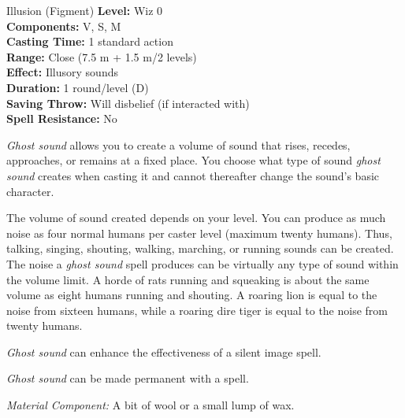 {Illusion (Figment)}
{
	\textbf{Level:}
	Wiz 0\\
	\textbf{Components:}
	V, S, M\\
	\textbf{Casting Time:}
	1 standard action\\
	\textbf{Range:}
	Close (7.5 m + 1.5 m/2 levels)\\
	\textbf{Effect:}
	Illusory sounds\\
	\textbf{Duration:}
	1 round/level (D)\\
	\textbf{Saving Throw:}
	Will disbelief (if interacted with)\\
	\textbf{Spell Resistance:}
	No\\
}
{
	\emph{Ghost sound} allows you to create a volume of sound that rises, recedes, approaches, or remains at a fixed place. You choose what type of sound \emph{ghost sound} creates when casting it and cannot thereafter change the sound's basic character.

	The volume of sound created depends on your level. You can produce as much noise as four normal humans per caster level (maximum twenty humans). Thus, talking, singing, shouting, walking, marching, or running sounds can be created. The noise a \emph{ghost sound} spell produces can be virtually any type of sound within the volume limit. A horde of rats running and squeaking is about the same volume as eight humans running and shouting. A roaring lion is equal to the noise from sixteen humans, while a roaring dire tiger is equal to the noise from twenty humans.

	\emph{Ghost sound} can enhance the effectiveness of a silent image spell.

	\emph{Ghost sound} can be made permanent with a  spell.

	\textit{Material Component:}
	A bit of wool or a small lump of wax.

}
